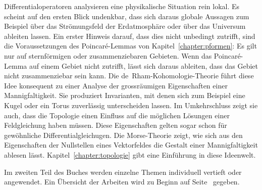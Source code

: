 Differentialoperatoren analysieren eine physikalische Situation
rein lokal.
Es scheint auf den ersten Blick undenkbar, dass sich daraus globale
Aussagen zum Beispiel über das Strömungsfeld der Erdatmosphäre oder
über das Universum ableiten lassen.
Ein erster Hinweis darauf, dass dies nicht unbedingt zutrifft, sind
die Voraussetzungen des Poincaré-Lemmas von Kapitel~\ref{chapter:pformen}:
%
Es gilt nur auf sternförmigen oder zusammenziebaren Gebieten.
Wenn das Poincaré-Lemma auf einem Gebiet nicht zutrifft, lässt sich
daraus ableiten, dass das Gebiet nicht zusammenziebar sein kann.
Die de~Rham-Kohomologie-Theorie führt diese Idee konsequent zu einer
%
Analyse der grossräumigen Eigenschaften einer Mannigfaltigkeit.
Sie produziert Invarianten, mit denen sich zum Beispiel eine Kugel
oder ein Torus zuverlässig unterscheiden lassen.
Im Umkehrschluss zeigt sie auch, dass die Topologie einen Einfluss
%
auf die möglichen Lösungen einer Feldgleichung haben müssen.
Diese Eigenschaften gelten sogar schon für gewöhnliche
Differentialgleichugen.
Die Morse-Theorie zeigt, wie sich aus den Eigenschaften der Nullstellen
%
eines Vektorfeldes die Gestalt einer Mannigfaltigkeit ablesen lässt.
Kapitel~\ref{chapter:topologie} gibt eine Einführung in diese 
Ideenwelt.

Im zweiten Teil des Buches werden einzelne Themen individuell
vertieft oder angewendet.
Ein Übersicht der Arbeiten wird zu Beginn auf Seite~\pageref{buch:uebersicht}
gegeben.

